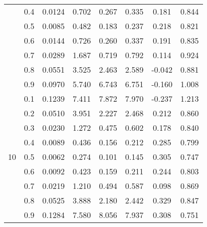 \documentclass[11pt,a4paper]{report}
\begin{document}
\begin{longtable}{ | c | c || c | c | c | c | c | c | }
 & 0.4 & 0.0124 & 0.702 & 0.267 & 0.335 & 0.181 & 0.844 \\
 & 0.5 & 0.0085 & 0.482 & 0.183 & 0.237 & 0.218 & 0.821 \\
 & 0.6 & 0.0144 & 0.726 & 0.260 & 0.337 & 0.191 & 0.835 \\
 & 0.7 & 0.0289 & 1.687 & 0.719 & 0.792 & 0.114 & 0.924 \\
 & 0.8 & 0.0551 & 3.525 & 2.463 & 2.589 & -0.042 & 0.881 \\
 & 0.9 & 0.0970 & 5.740 & 6.743 & 6.751 & -0.160 & 1.008 \\
 \hline
\multirow{9}{*}{10} & 0.1 & 0.1239 & 7.411 & 7.872 & 7.970 & -0.237 & 1.213 \\
 & 0.2 & 0.0510 & 3.951 & 2.227 & 2.468 & 0.212 & 0.860 \\
 & 0.3 & 0.0230 & 1.272 & 0.475 & 0.602 & 0.178 & 0.840 \\
 & 0.4 & 0.0089 & 0.436 & 0.156 & 0.212 & 0.285 & 0.799 \\
 & 0.5 & 0.0062 & 0.274 & 0.101 & 0.145 & 0.305 & 0.747 \\
 & 0.6 & 0.0092 & 0.423 & 0.159 & 0.211 & 0.244 & 0.803 \\
 & 0.7 & 0.0219 & 1.210 & 0.494 & 0.587 & 0.098 & 0.869 \\
 & 0.8 & 0.0525 & 3.888 & 2.180 & 2.442 & 0.329 & 0.847 \\
 & 0.9 & 0.1284 & 7.580 & 8.056 & 7.937 & 0.308 & 0.751 \\
 \hline
\hline
\end{longtable}
\end{document}
